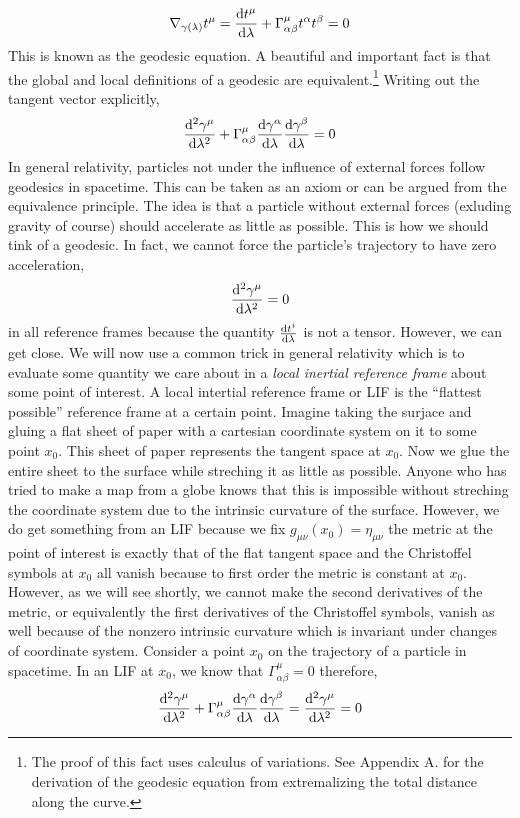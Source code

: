 \documentclass[11pt, a4paper]{article}
\begin{document}
\[ \nabla_{\gamma(\lambda)} t^{\mu} = \frac{\mathrm{d}t^\mu}{\mathrm{d}\lambda} +  \Gamma^\mu_{\alpha \beta} t^\alpha t^\beta  = 0\] 
This is known as the geodesic equation. A beautiful and important fact is that the global and local definitions of a geodesic are equivalent.\footnote{The proof of this fact uses calculus of variations. See Appendix A. for the derivation of the geodesic equation from extremalizing the total distance along the curve.} Writing out the tangent vector explicitly,
\[ \frac{\mathrm{d}^{2} \gamma^\mu}{\mathrm{d}\lambda^{2}} + \Gamma^{\mu}_{\alpha \beta} \frac{\mathrm{d}\gamma^\alpha}{\mathrm{d}\lambda} \frac{\mathrm{d}\gamma^\beta}{\mathrm{d}\lambda}  = 0\]
In general relativity, particles not under the influence of external forces follow geodesics in spacetime. This can be taken as an axiom or can be argued from the equivalence principle. The idea is that a particle without external forces (exluding gravity of course) should accelerate as little as possible. This is how we should tink of a geodesic. In fact, we cannot force the particle's trajectory to have zero acceleration,
\[ \frac{\mathrm{d}^{2} \gamma^\mu}{\mathrm{d}\lambda^{2}} = 0\]
in all reference frames because the quantity $\frac{\mathrm{d}t^i}{\mathrm{d}\lambda}$ is not a tensor. However, we can get close. We will now use a common trick in general relativity which is to evaluate some quantity we care about in a \textit{local inertial reference frame} about some point of interest. A local intertial reference frame or LIF is the ``flattest possible'' reference frame at a certain point. Imagine taking the surjace and gluing a flat sheet of paper with a cartesian coordinate system on it to some point $x_0$. This sheet of paper represents the tangent space at $x_0$. Now we glue the entire sheet to the surface while streching it as little as possible. Anyone who has tried to make a map from a globe knows that this is impossible without streching the coordinate system due to the intrinsic curvature of the surface. However, we do get something from an LIF because we fix $g_{\mu\nu}(x_0) = \eta_{\mu \nu}$ the metric at the point of interest is exactly that of the flat tangent space and the Christoffel symbols at $x_0$ all  vanish because to first order the metric is constant at $x_0$. However, as we will see shortly, we cannot make the second derivatives of the metric, or equivalently the first derivatives of the Christoffel symbols, vanish as well because of the nonzero intrinsic curvature which is invariant under changes of coordinate system. Consider a point $x_0$ on the trajectory of a particle in spacetime. In an LIF at $x_0$, we know that $\Gamma^{\mu}_{\alpha \beta} = 0$ therefore, 
\[ \frac{\mathrm{d}^{2} \gamma^\mu}{\mathrm{d}\lambda^{2}} + \Gamma^{\mu}_{\alpha \beta} \frac{\mathrm{d}\gamma^\alpha}{\mathrm{d}\lambda} \frac{\mathrm{d}\gamma^\beta}{\mathrm{d}\lambda} = \frac{\mathrm{d}^{2} \gamma^\mu}{\mathrm{d}\lambda^{2}} = 0\]
\end{document}
